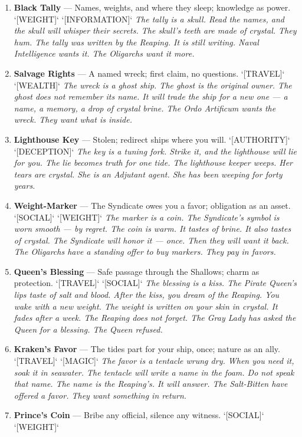 \begin{enumerate}
\item \textbf{Black Tally} --- Names, weights, and where they sleep; knowledge as power. `[WEIGHT]` `[INFORMATION]`
  \hfill \textit{The tally is a skull. Read the names, and the skull will whisper their secrets. The skull's teeth are made of crystal. They hum. The tally was written by the Reaping. It is still writing. Naval Intelligence wants it. The Oligarchs want it more.}
\item \textbf{Salvage Rights} --- A named wreck; first claim, no questions. `[TRAVEL]` `[WEALTH]`
  \hfill \textit{The wreck is a ghost ship. The ghost is the original owner. The ghost does not remember its name. It will trade the ship for a new one --- a name, a memory, a drop of crystal brine. The Ordo Artificum wants the wreck. They want what is inside.}
\item \textbf{Lighthouse Key} --- Stolen; redirect ships where you will. `[AUTHORITY]` `[DECEPTION]`
  \hfill \textit{The key is a tuning fork. Strike it, and the lighthouse will lie for you. The lie becomes truth for one tide. The lighthouse keeper weeps. Her tears are crystal. She is an Adjutant agent. She has been weeping for forty years.}
\item \textbf{Weight-Marker} --- The Syndicate owes you a favor; obligation as an asset. `[SOCIAL]` `[WEIGHT]`
  \hfill \textit{The marker is a coin. The Syndicate's symbol is worn smooth --- by regret. The coin is warm. It tastes of brine. It also tastes of crystal. The Syndicate will honor it --- once. Then they will want it back. The Oligarchs have a standing offer to buy markers. They pay in favors.}
\item[J] \textbf{Queen's Blessing} --- Safe passage through the Shallows; charm as protection. `[TRAVEL]` `[SOCIAL]`
  \hfill \textit{The blessing is a kiss. The Pirate Queen's lips taste of salt and blood. After the kiss, you dream of the Reaping. You wake with a new weight. The weight is written on your skin in crystal. It fades after a week. The Reaping does not forget. The Gray Lady has asked the Queen for a blessing. The Queen refused.}
\item[Q] \textbf{Kraken's Favor} --- The tides part for your ship, once; nature as an ally. `[TRAVEL]` `[MAGIC]`
  \hfill \textit{The favor is a tentacle wrung dry. When you need it, soak it in seawater. The tentacle will write a name in the foam. Do not speak that name. The name is the Reaping's. It will answer. The Salt-Bitten have offered a favor. They want something in return.}
\item[K] \textbf{Prince's Coin} --- Bribe any official, silence any witness. `[SOCIAL]` `[WEIGHT]`

\end{enumerate}
